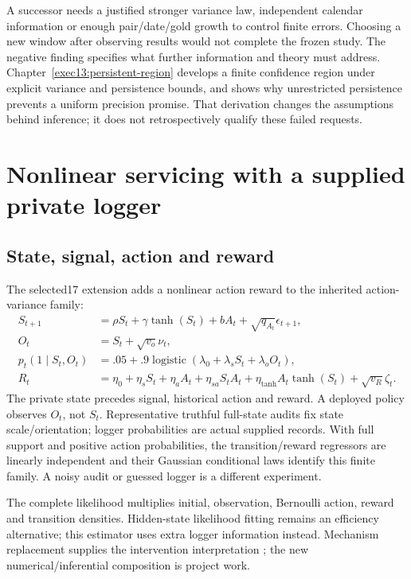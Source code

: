 A successor needs a justified stronger variance law, independent calendar information or enough pair/date/gold growth to control finite errors. Choosing a new window after observing results would not complete the frozen study. The negative finding specifies what further information and theory must address. Chapter~\ref{exec13:persistent-region} develops a finite confidence region under explicit variance and persistence bounds, and shows why unrestricted persistence prevents a uniform precision promise. That derivation changes the assumptions behind inference; it does not retrospectively qualify these failed requests.

\section{Nonlinear servicing with a supplied private logger}
\subsection{State, signal, action and reward}
The selected17 extension adds a nonlinear action reward to the inherited action-variance family:
\begin{align*}
 S_{t+1}&=\rho S_t+\gamma\tanh(S_t)+bA_t+\sqrt{q_{A_t}}\epsilon_{t+1},\\
 O_t&=S_t+\sqrt{v_o}\nu_t,\\
 p_t(1\mid S_t,O_t)&=.05+.9\operatorname{logistic}(\lambda_0+\lambda_sS_t+\lambda_oO_t),\\
 R_t&=\eta_0+\eta_sS_t+\eta_aA_t+\eta_{sa}S_tA_t+
 \eta_{\tanh}A_t\tanh(S_t)+\sqrt{v_R}\zeta_t.
\end{align*}
The private state precedes signal, historical action and reward. A deployed policy observes $O_t$, not $S_t$. Representative truthful full-state audits fix state scale/orientation; logger probabilities are actual supplied records. With full support and positive action probabilities, the transition/reward regressors are linearly independent and their Gaussian conditional laws identify this finite family. A noisy audit or guessed logger is a different experiment.

The complete likelihood multiplies initial, observation, Bernoulli action, reward and transition densities. Hidden-state likelihood fitting remains an efficiency alternative; this estimator uses extra logger information instead. Mechanism replacement supplies the intervention interpretation \cite{pearl2009}; the new numerical/inferential composition is project work.

